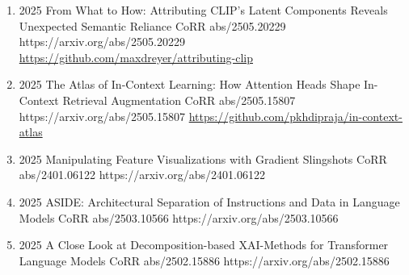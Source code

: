 {\begin{enumerate}
    
        \item {}
                        {2025}
                        {From What to How: Attributing CLIP's Latent Components Reveals Unexpected Semantic Reliance}
                        {CoRR abs/2505.20229}
                        {https://arxiv.org/abs/2505.20229}
                        {
                            \\\href{https://github.com/maxdreyer/attributing-clip}{https://github.com/maxdreyer/attributing-clip}
                        }
             
             
        \item {}
                        {2025}
                        {The Atlas of In-Context Learning: How Attention Heads Shape In-Context Retrieval Augmentation}
                        {CoRR abs/2505.15807}
                        {https://arxiv.org/abs/2505.15807}
                        {
                            \href{https://github.com/pkhdipraja/in-context-atlas}{https://github.com/pkhdipraja/in-context-atlas}
                        }
                        
                                               
                        
    
        \item {}
                        {2025}
                        {Manipulating Feature Visualizations with Gradient Slingshots}
                        {CoRR abs/2401.06122}
                        {https://arxiv.org/abs/2401.06122}    
    
    
        \item {}
                        {2025}
                        {ASIDE: Architectural Separation of Instructions and Data in Language Models}
                        {CoRR abs/2503.10566}
                        {https://arxiv.org/abs/2503.10566}    
                        
                        
        \item {}
                        {2025}
                        {A Close Look at Decomposition-based XAI-Methods for Transformer Language Models}
                        {CoRR abs/2502.15886}
                        {https://arxiv.org/abs/2502.15886}
                        


\end{enumerate}}

